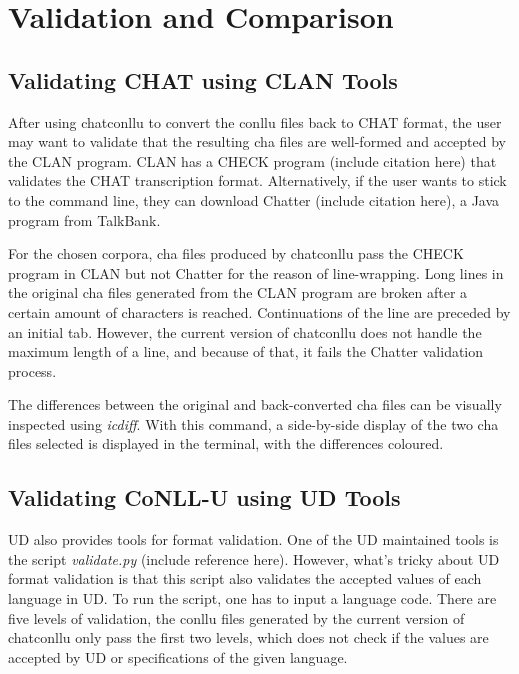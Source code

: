 \chapter{Validation and Comparison} %

\label{Chapter5} %

\section{Validating CHAT using CLAN Tools}

After using chatconllu to convert the conllu files back to CHAT format, the user may want to validate that the resulting cha files are well-formed and accepted by the CLAN program. CLAN has a CHECK program (include citation here) that validates the CHAT transcription format. Alternatively, if the user wants to stick to the command line, they can download Chatter (include citation here), a Java program from TalkBank.


For the chosen corpora, cha files produced by chatconllu pass the CHECK program in CLAN but not Chatter for the reason of line-wrapping. Long lines in the original cha files generated from the CLAN program are broken after a certain amount of characters is reached. Continuations of the line are preceded by an initial tab. However, the current version of chatconllu does not handle the maximum length of a line, and because of that, it fails the Chatter validation process.

The differences between the original and back-converted cha files can be visually inspected using \emph{icdiff}. With this command, a side-by-side display of the two cha files selected is displayed in the terminal, with the differences coloured.

\section{Validating CoNLL-U using UD Tools}

UD also provides tools for format validation. One of the UD maintained tools is the script \emph{validate.py} (include reference here). However, what's tricky about UD format validation is that this script also validates the accepted values of each language in UD. To run the script, one has to input a language code. There are five levels of validation, the conllu files generated by the current version of chatconllu only pass the first two levels, which does not check if the values are accepted by UD or specifications of the given language.
